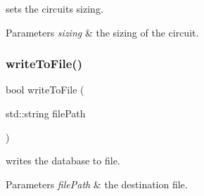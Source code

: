 sets the circuit\textquotesingle{}s sizing. 


\begin{DoxyParams}{Parameters}
{\em sizing} & the sizing of the circuit. \\
\hline
\end{DoxyParams}
\mbox{\label{class_open_chams_1_1_circuit_a2eb07935ec946a07edcee2255b781193}} 
\subsubsection{\texorpdfstring{write\+To\+File()}{writeToFile()}}
{\footnotesize\ttfamily bool write\+To\+File (\begin{DoxyParamCaption}\item[{std\+::string}]{file\+Path }\end{DoxyParamCaption})}



writes the database to file. 


\begin{DoxyParams}{Parameters}
{\em file\+Path} & the destination file. \\
\hline
\end{DoxyParams}
